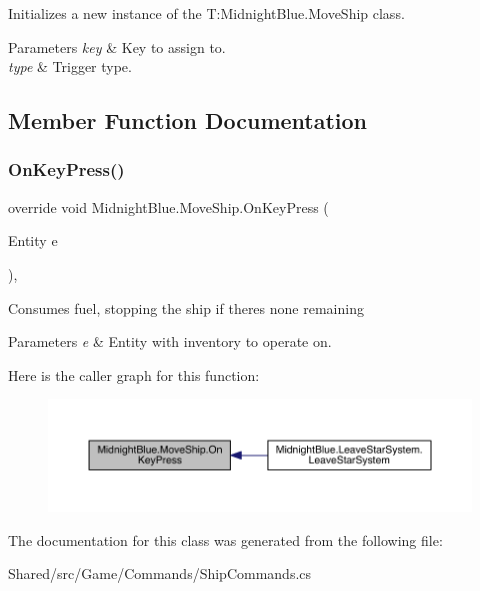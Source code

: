 Initializes a new instance of the T\+:\+Midnight\+Blue.\+Move\+Ship class. 


\begin{DoxyParams}{Parameters}
{\em key} & Key to assign to.\\
\hline
{\em type} & Trigger type.\\
\hline
\end{DoxyParams}


\subsection{Member Function Documentation}
\hypertarget{class_midnight_blue_1_1_move_ship_ac4b3dcb62954548f27bad5e5d6a00cdf}{}\label{class_midnight_blue_1_1_move_ship_ac4b3dcb62954548f27bad5e5d6a00cdf} 
\subsubsection{\texorpdfstring{On\+Key\+Press()}{OnKeyPress()}}
{\footnotesize\ttfamily override void Midnight\+Blue.\+Move\+Ship.\+On\+Key\+Press (\begin{DoxyParamCaption}\item[{Entity}]{e }\end{DoxyParamCaption})\hspace{0.3cm}{\ttfamily [inline]}, {\ttfamily [protected]}}



Consumes fuel, stopping the ship if there\textquotesingle{}s none remaining 


\begin{DoxyParams}{Parameters}
{\em e} & Entity with inventory to operate on.\\
\hline
\end{DoxyParams}
Here is the caller graph for this function\+:
\nopagebreak
\begin{figure}[H]
\begin{center}
\leavevmode
\includegraphics[width=350pt]{class_midnight_blue_1_1_move_ship_ac4b3dcb62954548f27bad5e5d6a00cdf_icgraph}
\end{center}
\end{figure}


The documentation for this class was generated from the following file\+:\begin{DoxyCompactItemize}
\item 
Shared/src/\+Game/\+Commands/Ship\+Commands.\+cs\end{DoxyCompactItemize}
